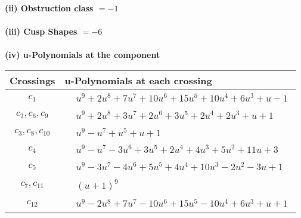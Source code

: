 \documentclass[1p]{elsarticle_modified}
\theoremstyle{definition}
\begin{document}
\flushleft \textbf{(ii) Obstruction class $= -1$}\\~\\
\flushleft \textbf{(iii) Cusp Shapes $= -6$}\\~\\
\newpage\renewcommand{\arraystretch}{1}
\flushleft \textbf{(iv) u-Polynomials at the component}\newline \\
\begin{tabular}{m{50pt}|m{274pt}}
Crossings & \hspace{64pt}u-Polynomials at each crossing \\
\hline $$\begin{aligned}c_{1}\end{aligned}$$&$\begin{aligned}
&u^9+2 u^8+7 u^7+10 u^6+15 u^5+10 u^4+6 u^3+u-1
\end{aligned}$\\
\hline $$\begin{aligned}c_{2},c_{6},c_{9}\end{aligned}$$&$\begin{aligned}
&u^9+2 u^8+3 u^7+2 u^6+3 u^5+2 u^4+2 u^3+u+1
\end{aligned}$\\
\hline $$\begin{aligned}c_{3},c_{8},c_{10}\end{aligned}$$&$\begin{aligned}
&u^9- u^7+u^5+u+1
\end{aligned}$\\
\hline $$\begin{aligned}c_{4}\end{aligned}$$&$\begin{aligned}
&u^9- u^7-3 u^6+3 u^5+2 u^4+4 u^3+5 u^2+11 u+3
\end{aligned}$\\
\hline $$\begin{aligned}c_{5}\end{aligned}$$&$\begin{aligned}
&u^9-3 u^7-4 u^6+5 u^5+4 u^4+10 u^3-2 u^2-3 u+1
\end{aligned}$\\
\hline $$\begin{aligned}c_{7},c_{11}\end{aligned}$$&$\begin{aligned}
&(u+1)^9
\end{aligned}$\\
\hline $$\begin{aligned}c_{12}\end{aligned}$$&$\begin{aligned}
&u^9-2 u^8+7 u^7-10 u^6+15 u^5-10 u^4+6 u^3+u+1
\end{aligned}$\\
\hline
\end{tabular}\\~\\
\end{document}

